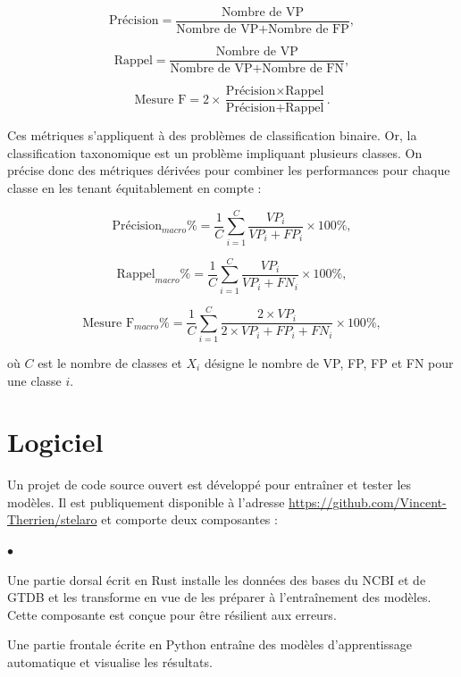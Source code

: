 \begin{equation}
    \text{Précision} = \frac{\text{Nombre de VP}}{\text{Nombre de VP} + \text{Nombre de FP}},
\end{equation}

\begin{equation}
    \text{Rappel} = \frac{\text{Nombre de VP}}{\text{Nombre de VP} + \text{Nombre de FN}},
\end{equation}

\begin{equation}
    \text{Mesure F} = 2 \times \frac{\text{Précision} \times \text{Rappel}}{\text{Précision} + \text{Rappel}}.
\end{equation}

Ces métriques s'appliquent à des problèmes de classification binaire. Or, la classification
taxonomique est un problème impliquant plusieurs classes. On précise donc des métriques dérivées
pour combiner les performances pour chaque classe en les tenant équitablement en compte :

\begin{equation}
    \label{eq:precision_macro}
    \text{Précision}_{macro} \% = \frac{1}{C} \sum^{C}_{i=1} \frac{VP_i}{VP_i + FP_i} \times 100 \%,
\end{equation}

\begin{equation}
    \label{eq:rappel_macro}
    \text{Rappel}_{macro} \% = \frac{1}{C} \sum^{C}_{i=1} \frac{VP_i}{VP_i + FN_i} \times 100 \%,
\end{equation}

\begin{equation}
    \label{eq:f1_macro}
    \text{Mesure F}_{macro} \% = \frac{1}{C} \sum^{C}_{i=1} \frac{2 \times VP_i}{2 \times VP_i + FP_i + FN_i} \times 100 \%,
\end{equation}

où $C$ est le nombre de classes et $X_i$ désigne le nombre de VP, FP, FP et FN pour une classe $i$.


\section{Logiciel}
Un projet de code source ouvert est développé pour entraîner et tester les modèles. Il est
publiquement disponible à l'adresse \url{https://github.com/Vincent-Therrien/stelaro} et comporte
deux composantes :

\begin{list}{$\bullet$}{}
    \item Une partie dorsal écrit en Rust installe les données des bases du NCBI et de GTDB et les
        transforme en vue de les préparer à l'entraînement des modèles. Cette composante est conçue
        pour être résilient aux erreurs.
    \item Une partie frontale écrite en Python entraîne des modèles d'apprentissage automatique et
        visualise les résultats.
\end{list}

